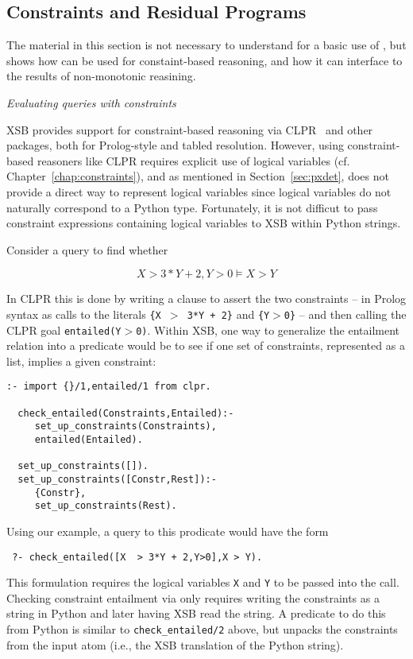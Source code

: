\subsection{Constraints and Residual Programs} 

The material in this section is not necessary to understand for a
basic use of \px{}, but shows how \px{} can be used for
constaint-based reasoning, and how it can interface to the results of
non-monotonic reasining.

\begin{example} \rm {\it Evaluating queries with constraints} \label{ex:connstraints}

  XSB provides support for constraint-based reasoning via
  CLPR~\cite{Holz95} and other packages, both for Prolog-style and
  tabled resolution.  However, using constraint-based reasoners like
  CLPR requires explicit use of logical variables
  (cf. Chapter~\ref{chap:constraints}), and as mentioned in
  Section~\ref{sec:pxdet}, \px{} does not provide a direct way to
  represent logical variables since logical variables do not naturally
  correspond to a Python type.  Fortunately, it is not difficut to
  pass constraint expressions containing logical variables to XSB
  within Python strings.

  Consider a query to find whether 

  \[X  > 3*Y + 2,Y>0 \models X > Y\]

\noindent  
  In CLPR this is done by writing a clause to assert the two
  constraints -- in Prolog syntax as calls to the literals {\tt \{X
    $>$ 3*Y + 2\}} and {\tt \{Y$>$0\}} -- and then calling the CLPR
  goal {\tt entailed(Y$>$0)}.  Within XSB, one way to generalize the
  entailment relation into a predicate would be to see if one set of
  constraints, represented as a list, implies a given constraint:

{\small  
\begin{verbatim}  
:- import {}/1,entailed/1 from clpr.

  check_entailed(Constraints,Entailed):- 
     set_up_constraints(Constraints),
     entailed(Entailed).

  set_up_constraints([]).
  set_up_constraints([Constr,Rest]):- 
     {Constr},
     set_up_constraints(Rest).
\end{verbatim}
}
\noindent
Using our example, a query to this prodicate would have the form

\begin{verbatim}
 ?- check_entailed([X  > 3*Y + 2,Y>0],X > Y).
\end{verbatim}
\noindent
This formulation requires the logical variables {\tt X} and {\tt Y} to
be passed into the call.  Checking constraint entailment via \px{}
only requires writing the constraints as a string in Python and later
having XSB read the string.  A predicate to do this from Python is
similar to {\tt check\_entailed/2} above, but unpacks the constraints
from the input atom (i.e., the XSB translation of the Python string).


\end{example}
